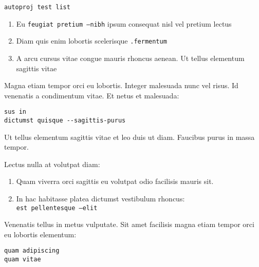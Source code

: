 \documentclass[9pt]{innovativeinnovation-cheatsheet}
\begin{document}
\begin{multicols*}{3}


\begin{lstlisting}
autoproj test list
\end{lstlisting}

\begin{enumerate}
  \item Eu \texttt{feugiat pretium --nibh}  ipsum consequat nisl vel pretium
        lectus
  \item Diam quis enim lobortis scelerisque \texttt{.fermentum}
  \item A arcu cursus vitae congue mauris rhoncus aenean. Ut tellus elementum
        sagittis vitae
\end{enumerate}


Magna etiam tempor orci eu lobortis. Integer malesuada nunc vel risus. Id
venenatis a condimentum vitae. Et netus et malesuada:

\begin{lstlisting}
sus in
dictumst quisque --sagittis-purus
\end{lstlisting}


Ut tellus elementum sagittis vitae et leo duis ut diam. Faucibus purus in
massa tempor.

Lectus nulla at volutpat diam:

\begin{enumerate}
  \item Quam viverra orci sagittis eu volutpat odio facilisis mauris sit.
  \item In hac habitasse platea dictumst vestibulum rhoncus:\\
    \texttt{est pellentesque --elit}
\end{enumerate}


Venenatis tellus in metus vulputate. Sit amet facilisis magna etiam tempor
orci eu lobortis elementum:

\begin{lstlisting}
quam adipiscing
quam vitae
\end{lstlisting}



\end{multicols*}
\end{document}
